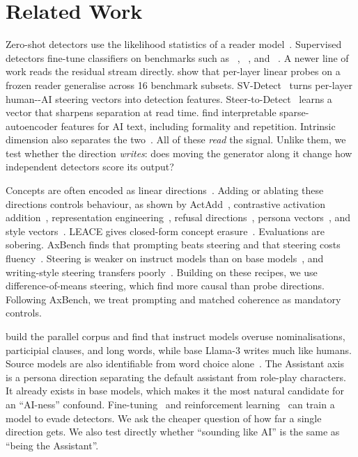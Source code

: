 \section{Related Work}
\label{sec:related}

Zero-shot detectors use the likelihood statistics of a reader model~\citep{mitchell2023detectgpt,bao2024fastdetectgpt,hans2024binoculars}. Supervised detectors fine-tune classifiers on benchmarks such as \hcthree~\citep{guo2023hc3}, \mage~\citep{li2024mage}, and \raid~\citep{dugan2024raid}.
A newer line of work reads the residual stream directly. \citet{quaremba2026linear} show that per-layer linear probes on a frozen reader generalise across 16 benchmark subsets. SV-Detect~\citep{vishnyakov2026svdetect} turns per-layer human-\versus-AI steering vectors into detection features. Steer-to-Detect~\citep{liang2026steer} learns a vector that sharpens separation at read time. \citet{kuznetsov2025feature} find interpretable sparse-autoencoder features for AI text, including formality and repetition. Intrinsic dimension also separates the two~\citep{tulchinskii2023intrinsic}.
All of these \emph{read} the signal. Unlike them, we test whether the direction \emph{writes}: does moving the generator along it change how independent detectors score its output?

Concepts are often encoded as linear directions~\citep{park2024linear,marks2024geometry}. Adding or ablating these directions controls behaviour, as shown by ActAdd~\citep{turner2023actadd}, contrastive activation addition~\citep{rimsky2024caa}, representation engineering~\citep{zou2023repe}, refusal directions~\citep{arditi2024refusal}, persona vectors~\citep{chen2025persona}, and style vectors~\citep{konen2024style}. LEACE gives closed-form concept erasure~\citep{belrose2023leace}.
Evaluations are sobering. AxBench finds that prompting beats steering and that steering costs fluency~\citep{wu2025axbench}. Steering is weaker on instruct models than on base models~\citep{steerweak2026}, and writing-style steering transfers poorly~\citep{stylesteer2026}.
Building on these recipes, we use difference-of-means steering, which \citet{marks2024geometry} find more causal than probe directions. Following AxBench, we treat prompting and matched coherence as mandatory controls.

\citet{reinhart2024hape} build the parallel \hape corpus and find that instruct models overuse nominalisations, participial clauses, and long words, while base Llama-3 writes much like humans. Source models are also identifiable from word choice alone~\citep{sun2025idiosyncrasies}.
The Assistant axis~\citep{lu2026assistant} is a persona direction separating the default assistant from role-play characters. It already exists in base models, which makes it the most natural candidate for an ``AI-ness'' confound.
Fine-tuning~\citep{pedrotti2025stress} and reinforcement learning~\citep{david2025authormist} can train a model to evade detectors. We ask the cheaper question of how far a single direction gets. We also test directly whether ``sounding like AI'' is the same as ``being the Assistant''.
